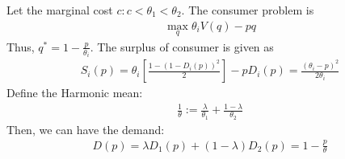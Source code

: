 \documentclass[11pt]{elegantbook}
\begin{document}
Let the marginal cost $c:c<\theta_1<\theta_2$. The consumer problem is
\begin{equation}
    \begin{aligned}
        \max_q \theta_i V(q)-pq
    \end{aligned}
    \nonumber
\end{equation}
Thus, $q^*=1-\frac{p}{\theta_i}$. The surplus of consumer is given as
\begin{equation}
    \begin{aligned}
        S_i(p)=\theta_i\left[\frac{1-(1-D_i(p))^2}{2}\right]-pD_i(p)=\frac{(\theta_i-p)^2}{2\theta_i}
    \end{aligned}
    \nonumber
\end{equation}
Define the Harmonic mean:
\begin{equation}
    \begin{aligned}
        \frac{1}{\theta}:=\frac{\lambda}{\theta_1}+\frac{1-\lambda}{\theta_2}
    \end{aligned}
    \nonumber
\end{equation}
Then, we can have the demand:
\begin{equation}
    \begin{aligned}
        D(p)=\lambda D_1(p)+\left(1-\lambda\right)D_2(p)=1-\frac{p}{\theta}
    \end{aligned}
    \nonumber
\end{equation}
\end{document}
